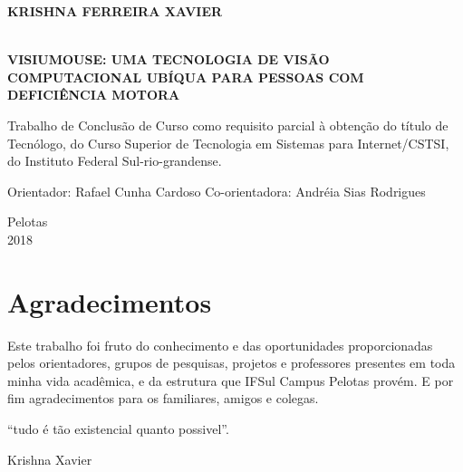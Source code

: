 \begin{titlepage}
\vfill
\begin{center}

    \begin{large} \bfseries KRISHNA FERREIRA XAVIER\end{large}\\[0.4in]
    \vspace{2cm}
    {\large\bfseries{VISIUMOUSE: UMA TECNOLOGIA DE VISÃO COMPUTACIONAL UBÍQUA PARA PESSOAS COM DEFICIÊNCIA MOTORA}\\}
    \vspace{1cm}
    \hspace{.45\linewidth}
    \begin{minipage}{.50\linewidth}

Trabalho de Conclusão de Curso como requisito parcial  à obtenção do título de Tecnólogo, do Curso Superior de Tecnologia em Sistemas para Internet/CSTSI, do Instituto Federal Sul-rio-grandense.            

            \vspace{0.5 cm}

            Orientador: Rafael Cunha Cardoso
            Co-orientadora: Andréia Sias Rodrigues
    
    \end{minipage}

    \vspace{2cm}
    \vfill
    {\large Pelotas\\ 2018}
\end{center}

\end{titlepage}

\chapter*{Agradecimentos}
\vspace*{5cm}
Este trabalho foi fruto do conhecimento e das oportunidades proporcionadas pelos orientadores, grupos de pesquisas, projetos e professores presentes em toda minha vida acadêmica, e da estrutura que IFSul Campus Pelotas provém. E por fim agradecimentos para os familiares, amigos e colegas.\\


%
\begin{flushright}
\begin{minipage}[r]{10cm}
\vspace{18cm}
``tudo é tão existencial quanto possivel''.
\begin{flushright}
Krishna Xavier
\end{flushright}
\end{minipage}
\end{flushright}